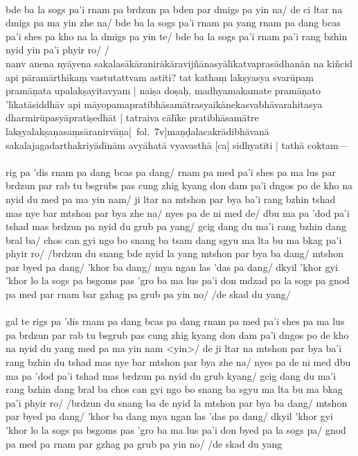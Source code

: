 \documentclass[12pt]{article}
\newcommand{\emdash} {\hspace{0em}—\hspace{0em}}
\begin{document}
\textbf{\TVB}\\
bde ba la sogs pa'i rnam pa brdzun pa bden par dmigs pa yin na/ de ci ltar na dmigs pa ma yin zhe na/ bde ba la sogs pa'i rnam pa yang rnam pa dang bcas pa'i shes pa kho na la dmigs pa yin te/ bde ba la sogs pa'i rnam pa'i rang bzhin nyid yin pa'i phyir ro/ /\\

nanv anena nyāyena sakalasākāranirākāravijñānasyālīkatvaprasādhanān na kiñcid api pāramārthikaṃ vastutattvam astīti? tat kathaṃ lakṣyasya svarūpaṃ pramāṇata upalakṣayitavyam | naiṣa doṣaḥ, madhyamakamate pramāṇato 'līkatāsiddhāv api māyopamapratibhāsamātrasyaikānekasvabhāvarahitasya dharmirūpasyāpratiṣedhāt | tatraiva cālīke pratibhāsamātre lakṣyalakṣaṇasaṃsāranirvāṇa[\MS\ fol.\ 7v]maṇḍalacakrādibhāvanā sakalajagadarthakriyādīnām avyāhatā vyavasthā [ca] sidhyatīti | tathā coktam\emdash \\

\textbf{\TVA}\\
rig pa 'dis rnam pa dang bcas pa dang/ rnam pa med pa'i shes pa ma lus par brdzun par rab tu bsgrubs pas cung zhig kyang don dam pa'i dngos po de kho na nyid du med pa ma yin nam/ ji ltar na mtshon par bya ba'i rang bzhin tshad mas nye bar mtshon par bya zhe na/ nyes pa de ni med de/ dbu ma pa 'dod pa'i tshad mas brdzun pa nyid du grub pa yang/ gcig dang du ma'i rang bzhin dang bral ba/ chos can gyi ngo bo snang ba tsam dang sgyu ma lta bu ma bkag pa'i phyir ro/ /brdzun du snang bde nyid la yang mtshon par bya ba dang/ mtshon par byed pa dang/ 'khor ba dang/ mya ngan las 'das pa dang/ dkyil 'khor gyi 'khor lo la sogs pa bsgoms pas 'gro ba ma lus pa'i don mdzad pa la sogs pa gnod pa med par rnam bar gzhag pa grub pa yin no/ /de skad du yang/ \\

\textbf{\TVB}\\
gal te rigs pa 'dis rnam pa dang bcas pa dang rnam pa med pa'i shes pa ma lus pa brdzun par rab tu bsgrub pas cung zhig kyang don dam pa'i dngos po de kho na nyid du yang med pa ma yin nam <yin>/ de ji ltar na mtshon par bya ba'i rang bzhin du tshad mas nye bar mtshon par bya zhe na/ nyes pa de ni med dbu ma pa 'dod pa'i tshad mas brdzun pa nyid du grub kyang/ gcig dang du ma'i rang bzhin dang bral ba chos can gyi ngo bo snang ba sgyu ma lta bu ma bkag pa'i phyir ro/ /brdzun du snang ba de nyid la mtshon par bya ba dang/ mtshon par byed pa dang/ 'khor ba dang mya ngan las 'das pa dang/ dkyil 'khor gyi 'khor lo la sogs pa bsgoms pas 'gro ba ma lus pa'i don byed pa la sogs pa/ gnod pa med pa rnam par gzhag pa grub pa yin no/ /de skad du yang 
\end{document}

